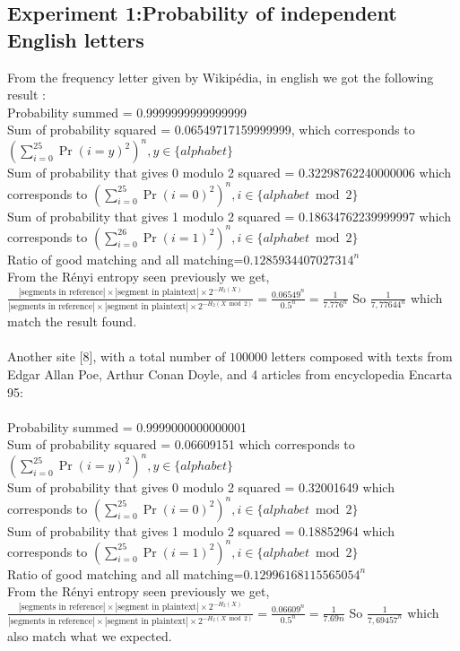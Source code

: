 \documentclass{article}
\begin{document}
\subsection*{Experiment 1:Probability of independent English letters}
From the frequency letter given by Wikip\'edia, in english we got the following result :\\
Probability summed = 0.9999999999999999
\\
Sum of probability squared = 0.06549717159999999, which corresponds to $(\sum_{i=0}^{25}{\Pr(i=y)^2})^n, y \in \{alphabet\} $\\
Sum of probability that gives 0 modulo 2 squared  = 0.32298762240000006 which corresponds to $(\sum_{i=0}^{25}{\Pr(i=0)^2})^n, i \in \{alphabet \bmod 2\} $\\
Sum of probability that gives 1 modulo 2 squared = 0.18634762239999997 which corresponds to $(\sum_{i=0}^{26}{\Pr(i=1)^2})^n, i \in \{alphabet \bmod 2\} $\\
Ratio of good matching and all matching=$0.1285934407027314^n$\\
From the R\'enyi entropy seen previously we get, $\frac{|\text{segments in reference}| \times |\text{segment in plaintext}| \times 2^{-H_{2}(X)}}{|\text{segments in reference}| \times |\text{segment in plaintext}| \times 2^{-H_{2}(X \bmod 2)}}  = \frac{0.06549^n}{0.5^n} = \frac{1}{7.776^n}$
So $\frac{1}{7,77644^n}$ which match the result found.
\\
\\
Another site [8], with a total number of $100000$ letters composed with texts from Edgar Allan Poe, Arthur Conan Doyle, and 4 articles from encyclopedia Encarta 95:\\
\\
Probability summed = 0.9999000000000001\\
Sum of probability squared = 0.06609151 which corresponds to $(\sum_{i=0}^{25}{\Pr(i=y)^2})^n, y \in \{alphabet\} $\\
Sum of probability that gives 0 modulo 2 squared = 0.32001649 which corresponds to $(\sum_{i=0}^{25}{\Pr(i=0)^2})^n, i \in \{alphabet \bmod 2\} $\\
Sum of probability that gives 1 modulo 2 squared = 0.18852964 which corresponds to $(\sum_{i=0}^{25}{\Pr(i=1)^2})^n, i \in \{alphabet \bmod 2\} $\\
Ratio of good matching and all matching=$0.12996168115565054^n$\\
From the R\'enyi entropy seen previously we get, $\frac{|\text{segments in reference}| \times |\text{segment in plaintext}| \times 2^{-H_{2}(X)}}{|\text{segments in reference}| \times |\text{segment in plaintext}| \times 2^{-H_{2}(X \bmod 2)}}  = \frac{0.06609^n}{0.5^n} = \frac{1}{7.69n}$
So $\frac{1}{7,69457^n}$ which also match what we expected.
\end{document}
